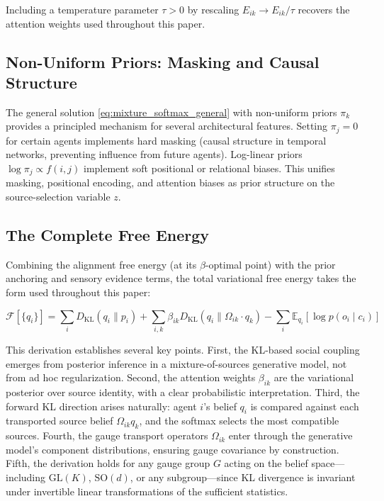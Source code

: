 \documentclass[12pt]{article}
\begin{document}
Including a temperature parameter $\tau > 0$ by rescaling $E_{ik} \to E_{ik}/\tau$ recovers the attention weights used throughout this paper.

\subsection{Non-Uniform Priors: Masking and Causal Structure}

The general solution \eqref{eq:mixture_softmax_general} with non-uniform priors $\pi_k$ provides a principled mechanism for several architectural features. Setting $\pi_j = 0$ for certain agents implements hard masking (causal structure in temporal networks, preventing influence from future agents). Log-linear priors $\log \pi_j \propto f(i,j)$ implement soft positional or relational biases. This unifies masking, positional encoding, and attention biases as prior structure on the source-selection variable $z$.

\subsection{The Complete Free Energy}

Combining the alignment free energy (at its $\beta$-optimal point) with the prior anchoring and sensory evidence terms, the total variational free energy takes the form used throughout this paper:

\begin{equation}
\boxed{
\mathcal{F}[\{q_i\}] = \sum_i D_{\mathrm{KL}}(q_i \| p_i) + \sum_{i,k} \beta_{ik} D_{\mathrm{KL}}(q_i \| \Omega_{ik}\cdot q_k) - \sum_i \mathbb{E}_{q_i}[\log p(o_i \mid c_i)]
}
\end{equation}

This derivation establishes several key points. First, the KL-based social coupling emerges from posterior inference in a mixture-of-sources generative model, not from ad hoc regularization. Second, the attention weights $\beta_{ik}$ are the variational posterior over source identity, with a clear probabilistic interpretation. Third, the forward KL direction arises naturally: agent $i$'s belief $q_i$ is compared against each transported source belief $\Omega_{ik} q_k$, and the softmax selects the most compatible sources. Fourth, the gauge transport operators $\Omega_{ik}$ enter through the generative model's component distributions, ensuring gauge covariance by construction. Fifth, the derivation holds for any gauge group $G$ acting on the belief space---including $\mathrm{GL}(K)$, $\mathrm{SO}(d)$, or any subgroup---since KL divergence is invariant under invertible linear transformations of the sufficient statistics.
\end{document}
